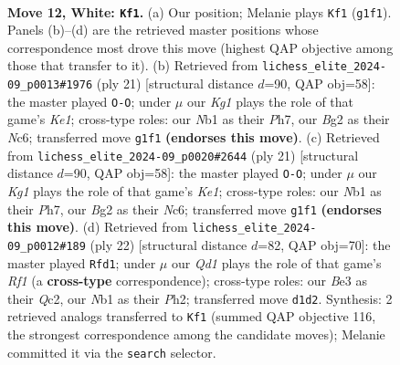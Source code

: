 \documentclass[11pt]{article}
\begin{document}
\clearpage

\begin{figure}[p]\centering
\begin{subfigure}{0.46\textwidth}\centering
\resizebox{\linewidth}{!}{%
\newchessgame
\chessboard[
  setfen={rnb1r1k1/1pp1bppp/pn1qp3/4N3/2pP4/4B1P1/PP2PPBP/RN1QR1K1 w - - 2 12},
  showmover=false,
  pgfstyle=straightmove, color=movearrow, markmove={g1-f1}
]}
\caption{}
\end{subfigure}\hfill
\begin{subfigure}{0.46\textwidth}\centering
\resizebox{\linewidth}{!}{%
\newchessgame
\chessboard[
  setfen={r2qk2r/2p2ppp/p1n1b3/1p1pP3/4n3/1B2QN2/PPP2PPP/RN3RK1 b kq - 0 11},
  showmover=false,
  pgfstyle=straightmove, color=movearrow, markmove={e8-g8}
]}
\caption{}
\end{subfigure}
\\[4pt]
\begin{subfigure}{0.46\textwidth}\centering
\resizebox{\linewidth}{!}{%
\newchessgame
\chessboard[
  setfen={r2qk2r/2p2ppp/p1n1b3/1p1pP3/4n3/1B2QN2/PPP2PPP/RN3RK1 b kq - 0 11},
  showmover=false,
  pgfstyle=straightmove, color=movearrow, markmove={e8-g8}
]}
\caption{}
\end{subfigure}\hfill
\begin{subfigure}{0.46\textwidth}\centering
\resizebox{\linewidth}{!}{%
\newchessgame
\chessboard[
  setfen={rnb2rk1/p3bppp/1pp1pn2/2q1N3/2p2B2/2N3P1/PPQ1PPBP/R4RK1 w - - 2 12},
  showmover=false,
  pgfstyle=straightmove, color=movearrow, markmove={f1-d1}
]}
\caption{}
\end{subfigure}
\caption{\textbf{Move 12, White: \texttt{Kf1}.} (a) Our position; Melanie plays \texttt{Kf1} (\texttt{g1f1}). Panels (b)--(d) are the retrieved master positions whose correspondence most drove this move (highest QAP objective among those that transfer to it). (b) Retrieved from \texttt{lichess\_elite\_2024-09\_p0013\#1976} (ply 21) [structural distance $d$=90, QAP obj=58]: the master played \texttt{O-O}; under $\mu$ our \emph{Kg1} plays the role of that game's \emph{Ke1}; cross-type roles: our \emph{N}b1 as their \emph{P}h7, our \emph{B}g2 as their \emph{N}c6; transferred move \texttt{g1f1} \textbf{(endorses this move)}. (c) Retrieved from \texttt{lichess\_elite\_2024-09\_p0020\#2644} (ply 21) [structural distance $d$=90, QAP obj=58]: the master played \texttt{O-O}; under $\mu$ our \emph{Kg1} plays the role of that game's \emph{Ke1}; cross-type roles: our \emph{N}b1 as their \emph{P}h7, our \emph{B}g2 as their \emph{N}c6; transferred move \texttt{g1f1} \textbf{(endorses this move)}. (d) Retrieved from \texttt{lichess\_elite\_2024-09\_p0012\#189} (ply 22) [structural distance $d$=82, QAP obj=70]: the master played \texttt{Rfd1}; under $\mu$ our \emph{Qd1} plays the role of that game's \emph{Rf1} (a \textbf{cross-type} correspondence); cross-type roles: our \emph{B}e3 as their \emph{Q}c2, our \emph{N}b1 as their \emph{P}h2; transferred move \texttt{d1d2}. Synthesis: 2 retrieved analogs transferred to \texttt{Kf1} (summed QAP objective 116, the strongest correspondence among the candidate moves); Melanie committed it via the \texttt{search} selector.}
\label{fig:thought-m22}
\end{figure}
\end{document}

